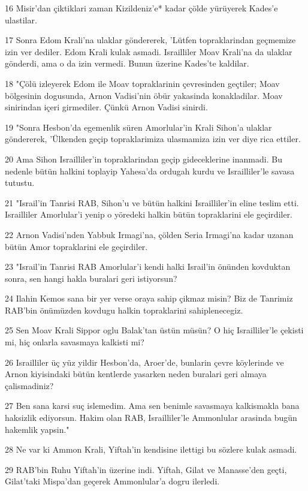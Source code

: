 \par 16 Misir'dan çiktiklari zaman Kizildeniz'e* kadar çölde yürüyerek Kades'e ulastilar.
\par 17 Sonra Edom Krali'na ulaklar göndererek, 'Lütfen topraklarindan geçmemize izin ver dediler. Edom Krali kulak asmadi. Israilliler Moav Krali'na da ulaklar gönderdi, ama o da izin vermedi. Bunun üzerine Kades'te kaldilar.
\par 18 "Çölü izleyerek Edom ile Moav topraklarinin çevresinden geçtiler; Moav bölgesinin dogusunda, Arnon Vadisi'nin öbür yakasinda konakladilar. Moav sinirindan içeri girmediler. Çünkü Arnon Vadisi sinirdi.
\par 19 "Sonra Hesbon'da egemenlik süren Amorlular'in Krali Sihon'a ulaklar göndererek, 'Ülkenden geçip topraklarimiza ulasmamiza izin ver diye rica ettiler.
\par 20 Ama Sihon Israilliler'in topraklarindan geçip gideceklerine inanmadi. Bu nedenle bütün halkini toplayip Yahesa'da ordugah kurdu ve Israilliler'le savasa tutustu.
\par 21 "Israil'in Tanrisi RAB, Sihon'u ve bütün halkini Israilliler'in eline teslim etti. Israilliler Amorlular'i yenip o yöredeki halkin bütün topraklarini ele geçirdiler.
\par 22 Arnon Vadisi'nden Yabbuk Irmagi'na, çölden Seria Irmagi'na kadar uzanan bütün Amor topraklarini ele geçirdiler.
\par 23 "Israil'in Tanrisi RAB Amorlular'i kendi halki Israil'in önünden kovduktan sonra, sen hangi hakla buralari geri istiyorsun?
\par 24 Ilahin Kemos sana bir yer verse oraya sahip çikmaz misin? Biz de Tanrimiz RAB'bin önümüzden kovdugu halkin topraklarini sahiplenecegiz.
\par 25 Sen Moav Krali Sippor oglu Balak'tan üstün müsün? O hiç Israilliler'le çekisti mi, hiç onlarla savasmaya kalkisti mi?
\par 26 Israilliler üç yüz yildir Hesbon'da, Aroer'de, bunlarin çevre köylerinde ve Arnon kiyisindaki bütün kentlerde yasarken neden buralari geri almaya çalismadiniz?
\par 27 Ben sana karsi suç islemedim. Ama sen benimle savasmaya kalkismakla bana haksizlik ediyorsun. Hakim olan RAB, Israilliler'le Ammonlular arasinda bugün hakemlik yapsin."
\par 28 Ne var ki Ammon Krali, Yiftah'in kendisine ilettigi bu sözlere kulak asmadi.
\par 29 RAB'bin Ruhu Yiftah'in üzerine indi. Yiftah, Gilat ve Manasse'den geçti, Gilat'taki Mispa'dan geçerek Ammonlular'a dogru ilerledi.
